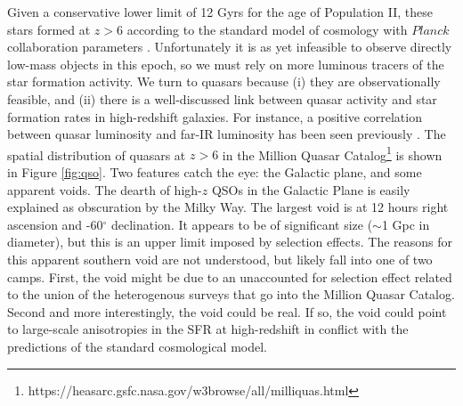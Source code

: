 \documentclass[]{pasa}
\begin{document}
Given a conservative lower limit of 12 Gyrs for the age of Population II, these stars formed at $z >6$  according to the standard model of cosmology with $Planck$ collaboration parameters \citep{planck_params}. 
Unfortunately it is as yet infeasible to observe directly low-mass objects in this epoch, so we must rely on more luminous tracers of the star formation activity. 
We turn to quasars because  (i) they are observationally feasible, and (ii) there is a well-discussed link between quasar activity and star formation rates in high-redshift galaxies. 
For instance, a positive correlation between quasar luminosity and far-IR luminosity has been seen previously \citep{Wang2011,Omont2013,Venemans2016}.
The spatial distribution of quasars at $z>6$ in the Million Quasar Catalog\footnote{ https://heasarc.gsfc.nasa.gov/w3browse/all/milliquas.html} \citep{Flesch2015}
 is shown in Figure \ref{fig:qso}. 
 Two features catch the eye: the Galactic plane, and some apparent voids. 
The dearth of high-$z$ QSOs in the Galactic Plane is easily explained as obscuration by the Milky Way. 
The largest void is at 12 hours right ascension and -60$^\circ$ declination. 
 It appears to be of significant size ($\sim$1 Gpc in diameter), but this is an upper limit imposed by selection effects. 
 The reasons for this apparent southern void are not understood, but likely fall into one of two camps. 
 First, the void might be due to an unaccounted for selection effect related to the union of the heterogenous surveys that go into the Million Quasar Catalog. 
 Second and more interestingly, the void could be real. 
 If so, the void could point to large-scale anisotropies in the SFR at high-redshift in conflict with the predictions of the standard cosmological model. 
\end{document}
